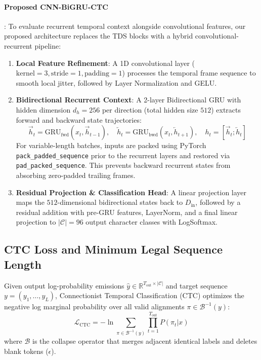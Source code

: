 \documentclass{article}
\begin{document}
\paragraph{Proposed CNN-BiGRU-CTC}:
To evaluate recurrent temporal context alongside convolutional features, our proposed architecture replaces the TDS blocks with a hybrid convolutional-recurrent pipeline:
\begin{enumerate}
    \item \textbf{Local Feature Refinement}: A 1D convolutional layer ($\text{kernel}=3, \text{stride}=1, \text{padding}=1$) processes the temporal frame sequence to smooth local jitter, followed by Layer Normalization and GELU.
    \item \textbf{Bidirectional Recurrent Context}: A 2-layer Bidirectional GRU with hidden dimension $d_h = 256$ per direction (total hidden size $512$) extracts forward and backward state trajectories:
    \begin{equation}
        \vec{h}_t = \text{GRU}_{\text{fwd}}(x_t, \vec{h}_{t-1}), \quad \overleftarrow{h}_t = \text{GRU}_{\text{bwd}}(x_t, \overleftarrow{h}_{t+1}), \quad h_t = [\vec{h}_t; \overleftarrow{h}_t]
    \end{equation}
    For variable-length batches, inputs are packed using PyTorch \texttt{pack\_padded\_sequence} prior to the recurrent layers and restored via \texttt{pad\_packed\_sequence}. This prevents backward recurrent states from absorbing zero-padded trailing frames.
    \item \textbf{Residual Projection \& Classification Head}: A linear projection layer maps the $512$-dimensional bidirectional states back to $D_{\text{in}}$, followed by a residual addition with pre-GRU features, LayerNorm, and a final linear projection to $|\mathcal{C}| = 96$ output character classes with LogSoftmax.
\end{enumerate}

\subsection{CTC Loss and Minimum Legal Sequence Length}
Given output log-probability emissions $\hat{y} \in \mathbb{R}^{T_{\text{out}} \times |\mathcal{C}|}$ and target sequence $y = (y_1, \dots, y_L)$, Connectionist Temporal Classification (CTC) optimizes the negative log marginal probability over all valid alignments $\pi \in \mathcal{B}^{-1}(y)$:
\begin{equation}
    \mathcal{L}_{\text{CTC}} = -\ln \sum_{\pi \in \mathcal{B}^{-1}(y)} \prod_{t=1}^{T_{\text{out}}} P(\pi_t | x)
\end{equation}
where $\mathcal{B}$ is the collapse operator that merges adjacent identical labels and deletes blank tokens ($\epsilon$). 
\end{document}
